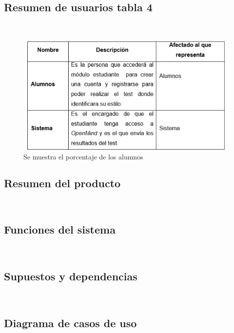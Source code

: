 \documentclass[letterpaper,oneside,openany,11pt]{book}
\begin{document}
\subsection{Resumen de usuarios tabla 4}
\noindent \\

\begin{figure}[H]
	\centering
	\includegraphics[width=1.0\textwidth]{./Imagenes/11}
	\caption{Se muestra el porcentaje de los alumnos}
\end{figure}

\subsection{Resumen del producto}
\noindent \\

\subsection{Funciones del sistema}
\noindent \\

\subsection{Supuestos y dependencias}
\noindent \\

\subsection{Diagrama de casos de uso}
\noindent \\
\end{document}
